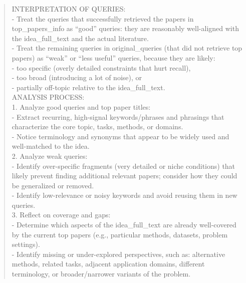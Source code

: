 \begin{quote}
\begin{tcolorbox}[breakable,colback=search!20!white, colframe=search!60!black, title=\textbf{Prompt for Search Agent (Query Refinement - Literature)}]
        INTERPRETATION OF QUERIES:\\
        - Treat the queries that successfully retrieved the papers in top\_papers\_info as ``good'' queries: they are reasonably well-aligned with the idea\_full\_text and the actual literature.\\
        - Treat the remaining queries in original\_queries (that did not retrieve top papers) as ``weak'' or ``less useful'' queries, because they are likely:\\
        - too specific (overly detailed constraints that hurt recall),\\
        - too broad (introducing a lot of noise), or\\
        - partially off-topic relative to the idea\_full\_text.\\

        ANALYSIS PROCESS:\\
        1. Analyze good queries and top paper titles:\\
        - Extract recurring, high-signal keywords/phrases and phrasings that characterize the core topic, tasks, methods, or domains.\\
        - Notice terminology and synonyms that appear to be widely used and well-matched to the idea.\\

        2. Analyze weak queries:\\
        - Identify over-specific fragments (very detailed or niche conditions) that likely prevent finding additional relevant papers; consider how they could be generalized or removed.\\
        - Identify low-relevance or noisy keywords and avoid reusing them in new queries.\\

        3. Reflect on coverage and gaps:\\
        - Determine which aspects of the idea\_full\_text are already well-covered by the current top papers (e.g., particular methods, datasets, problem settings).\\
        - Identify missing or under-explored perspectives, such as: alternative methods, related tasks, adjacent application domains, different terminology, or broader/narrower variants of the problem.\\


\end{tcolorbox}
\end{quote}
